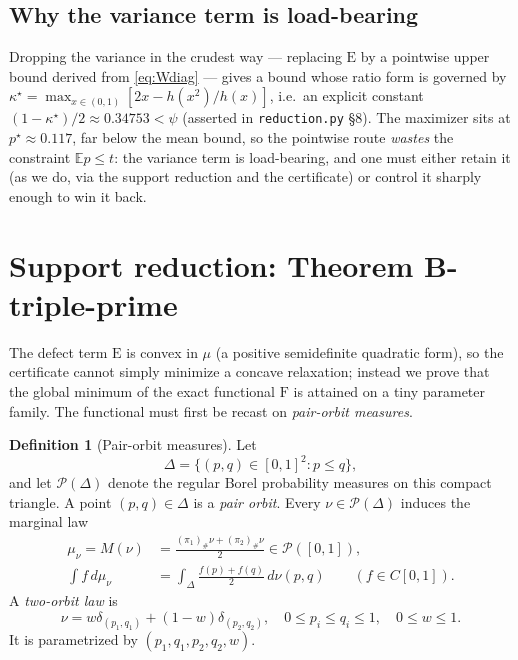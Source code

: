 \documentclass[11pt]{article}
\theoremstyle{plain}
\theoremstyle{definition}
\newtheorem{definition}[theorem]{Definition}
\theoremstyle{remark}
\newcommand{\PP}{\mathcal P}
\newcommand{\DD}{\Delta}
\newcommand{\EE}{\mathbb E}
\newcommand{\Ee}{\mathrm{E}}
\newcommand{\Ff}{\mathrm{F}}
\begin{document}
\subsection{Why the variance term is load-bearing}
Dropping the variance in the crudest way --- replacing $\Ee$ by a pointwise
upper bound derived from \eqref{eq:Wdiag} --- gives a bound whose ratio form is
governed by $\kappa^{\star}=\max_{x\in(0,1)}[2x-h(x^2)/h(x)]$, i.e.\ an
explicit constant $(1-\kappa^{\star})/2\approx0.34753<\psi$ (asserted in
\texttt{reduction.py} \S8). The maximizer sits at $p^{\star}\approx0.117$,
far below the mean bound, so the pointwise route \emph{wastes} the constraint
$\EE p\le t$: the variance term is load-bearing, and one must either retain it
(as we do, via the support reduction and the certificate) or control it sharply
enough to win it back.

\section{Support reduction: Theorem B-triple-prime}
\label{sec:B3}

The defect term $\Ee$ is convex in $\mu$ (a positive semidefinite quadratic
form), so the certificate cannot simply minimize a concave relaxation; instead we prove
that the global minimum of the exact functional $\Ff$ is attained on a tiny
parameter family. The functional must first be recast on \emph{pair-orbit
measures}.

\begin{definition}[Pair-orbit measures]
\label{def:pair}
Let
\[
\DD=\{(p,q)\in[0,1]^2:p\le q\},
\]
and let $\PP(\DD)$ denote the regular Borel probability measures on this
compact triangle.  A point $(p,q)\in\DD$ is a \emph{pair orbit}.  Every
$\nu\in\PP(\DD)$ induces the marginal law
\begin{align*}
\mu_\nu=M(\nu)
&=\frac{(\pi_1)_\#\nu+(\pi_2)_\#\nu}{2}\in\PP([0,1]),\\
\int f\,d\mu_\nu
&=\int_{\DD}\frac{f(p)+f(q)}2\,d\nu(p,q)
\qquad(f\in C[0,1]).
\end{align*}
A \emph{two-orbit law} is
\[
\nu=w\delta_{(p_1,q_1)}+(1-w)\delta_{(p_2,q_2)},
\quad
0\le p_i\le q_i\le1,\quad 0\le w\le1.
\]
It is parametrized by $(p_1,q_1,p_2,q_2,w)$.
\end{definition}
\end{document}
